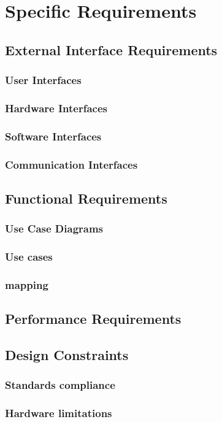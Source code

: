 \documentclass{article}
\begin{document}
\section{Specific Requirements}
\subsection{External Interface Requirements}
\subsubsection{User Interfaces}
\subsubsection{Hardware Interfaces}
\subsubsection{Software Interfaces}
\subsubsection{Communication Interfaces}
\subsection{Functional Requirements}
\subsubsection{Use Case Diagrams}
\subsubsection{Use cases}
\subsubsection{mapping}
\subsection{Performance Requirements}
\subsection{Design Constraints}
\subsubsection{Standards compliance}
\subsubsection{Hardware limitations}
\end{document}
